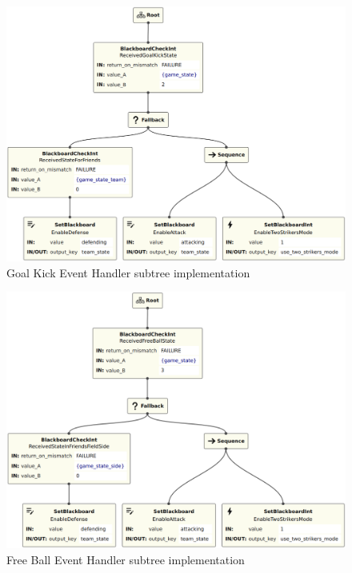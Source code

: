 \begin{figure}[!h]
    \centering
    \includegraphics[width=0.9\linewidth]{chapters/development/images/GoalKickEventHandler.png}
    \caption{Goal Kick Event Handler subtree implementation}
    \label{fig:goal_kick_event_handler_impl}
\end{figure}

\begin{figure}[!h]
    \centering
    \includegraphics[width=0.9\linewidth]{chapters/development/images/FreeBallEventHandler.png}
    \caption{Free Ball Event Handler subtree implementation}
    \label{fig:free_ball_event_handler_impl}
\end{figure}

